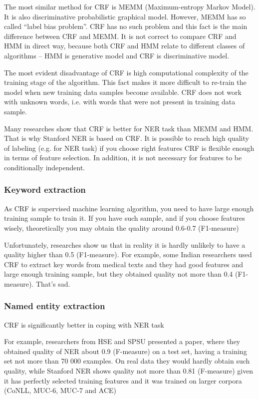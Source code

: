 The most similar method for CRF is MEMM (Maximum-entropy Markov Model). It is also discriminative probabilistic graphical model. However, MEMM has so called “label bias problem”. CRF has no such problem and this fact is the main difference between CRF and MEMM. It is not correct to compare CRF and HMM in direct way, because both CRF and HMM relate to different classes of algorithms – HMM is generative model and CRF is discriminative model.

The most evident disadvantage of CRF is high computational complexity of the training stage of the algorithm. This fact makes it more difficult to re-train the model when new training data samples become available. CRF does not work with unknown words, i.e. with words that were not present in training data sample.

Many researches show that CRF is better for NER task than MEMM and HMM. That is why Stanford NER is based on CRF. It is possible to reach high quality of labeling (e.g. for NER task) if you choose right features
CRF is flexible enough in terms of feature selection. In addition, it is not necessary for features to be conditionally independent.

\subsubsection{Keyword extraction}

As CRF is supervised machine learning algorithm, you need to have large enough training sample to train it. If you have such sample, and if you choose features wisely, theoretically you may obtain the quality around 0.6-0.7 (F1-measure)

Unfortunately, researches show us that in reality it is hardly unlikely to have a quality higher than 0.5 (F1-measure). For example, some Indian researchers used CRF to extract key words from medical texts and they had good features and large enough training sample, but they obtained quality not more than 0.4 (F1-measure). That’s sad.


\subsubsection{Named entity extraction}

CRF is significantly better in coping with NER task

For example, researchers from HSE and SPSU presented a paper, where they obtained quality of NER about 0.9 (F-measure) on a test set, having a training set not more than 70 000 examples. On real data they would hardly obtain such quality, while Stanford NER shows quality not more than 0.81 (F-measure) given it has perfectly selected training features and it was trained on larger corpora (CoNLL, MUC-6, MUC-7 and ACE)

